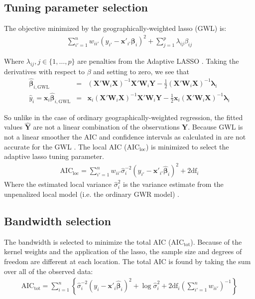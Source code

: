 \documentclass[authoryear, review, 11pt]{elsarticle}
\begin{document}
	\subsection{Tuning parameter selection}
	The objective minimized by the geographically-weighted lasso (GWL) is:	
	\begin{eqnarray}
		\sum_{i'=1}^n w_{ii'} \left(y_{i'} - \bm{x}'_{i'} \bm{\beta}_i \right)^2 + \sum_{j=1}^p \lambda_{ij} \beta_{ij}
	\end{eqnarray}
	
	Where $\lambda_{ij}, j \in \{1, \dots, p\}$ are penalties from the Adaptive LASSO \citep{Zou:2006}. Taking the derivatives with respect to $\beta$ and setting to zero, we see that
	\begin{eqnarray}
		\hat{\bm{\beta}}_{i, \mbox{GWL}} &=& \left( \bm{X}'\bm{W}_i\bm{X} \right)^{-1}  \bm{X}'\bm{W}_i\bm{Y}  - \frac{1}{2} \left(\bm{X}'\bm{W}_i\bm{X} \right)^{-1} \bm{\lambda}_i\\
		\hat{y}_i = \bm{x}_i \hat{\bm{\beta}}_{i, \mbox{GWL}} &=&  \bm{x}_i \left( \bm{X}'\bm{W}_i\bm{X} \right)^{-1}  \bm{X}'\bm{W}_i\bm{Y}  - \frac{1}{2} \bm{x}_i \left(\bm{X}'\bm{W}_i\bm{X} \right)^{-1} \bm{\lambda}_i
	\end{eqnarray}
	
	So unlike in the case of ordinary geographically-weighted regression, the fitted values $\hat{\bm{Y}}$ are not a linear combination of the observations $\bm{Y}$. Because GWL is not a linear smoother the AIC and confidence intervals as calculated in \cite{Fotheringham:2002} are not accurate for the GWL \citep{Zou:2006}. The local AIC ($\mbox{AIC}_{\mbox{loc}}$) is minimized to select the adaptive lasso tuning parameter.
	\begin{eqnarray}
		\mbox{AIC}_{\mbox{loc}} = \sum_{i'=1}^n w_{ii'} \hat{\sigma}_i^{-2} \left( y_{i'} - \bm{x}'_{i'} \hat{\bm{\beta}}_i \right)^2 + 2 \mbox{df}_i
	\end{eqnarray}	
	Where the estimated local variance $\hat{\sigma}_i^2$ is the variance estimate from the unpenalized local model (i.e. the ordinary GWR model) \citep{Zou:2007}.\\
	 
	\subsection{Bandwidth selection}
	The bandwidth is selected to minimize the total AIC ($\mbox{AIC}_{\mbox{tot}}$). Because of the kernel weights and the application of the lasso, the sample size and degrees of freedom are different at each location. The total AIC is found by taking the sum over all of the observed data:		
	\begin{eqnarray}
		\mbox{AIC}_{\mbox{tot}} = \sum_{i=1}^n \left\{ \hat{\sigma}_i^{-2} \left( y_i - \bm{x}'_i \hat{\bm{\beta}}_i \right)^2 + \log \hat{\sigma}_i^2 + 2 \mbox{df}_i \left(\sum_{i'=1}^n w_{ii'} \right)^{-1} \right\}
	\end{eqnarray}
			
\end{document}
